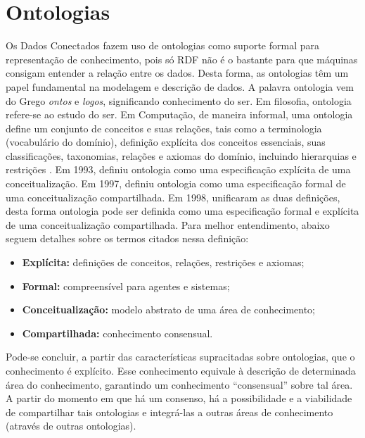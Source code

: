 \section{Ontologias}
Os Dados Conectados fazem uso de ontologias como suporte formal para representação de conhecimento, pois só RDF não é o bastante para que máquinas consigam entender a relação entre os dados. Desta forma, as ontologias têm um papel fundamental na modelagem e descrição de dados. A palavra ontologia vem do Grego \textit{ontos} e \textit{logos}, significando conhecimento do ser. Em filosofia, ontologia refere-se ao estudo do ser. Em Computação, de maneira informal, uma ontologia define um conjunto de conceitos e suas relações, tais como a terminologia (vocabulário do domínio), definição explícita dos conceitos essenciais, suas classificações, taxonomias, relações e axiomas do domínio, incluindo hierarquias e restrições \cite{deved2006semantic}. Em 1993, \citeauthor{gruber1993translation} definiu ontologia como uma especificação explícita de uma conceitualização. Em 1997, \citeauthor{borstw1997construction} definiu ontologia como uma especificação formal de uma conceitualização compartilhada. Em 1998, \citeauthor{studer1998knowledge} unificaram as duas definições, desta forma ontologia pode ser definida como uma especificação formal e explícita de uma conceitualização compartilhada. Para melhor entendimento, abaixo seguem detalhes sobre os termos citados nessa definição: 
% 
% 
%
%
\begin{itemize}
	\item \textbf{Explícita:} definições de conceitos, relações, restrições e axiomas; 
	\item \textbf{Formal:} compreensível para agentes e sistemas; 
	\item \textbf{Conceitualização:} modelo abstrato de uma área de conhecimento; 
	\item \textbf{Compartilhada:} conhecimento consensual. 
\end{itemize}
Pode-se concluir, a partir das características supracitadas sobre ontologias, que o conhecimento é explícito. Esse conhecimento equivale à descrição de determinada área do conhecimento, garantindo um conhecimento “consensual” sobre tal área. A partir do momento em que há um consenso, há a possibilidade e a viabilidade de compartilhar tais ontologias e integrá-las a outras áreas de conhecimento (através de outras ontologias).


